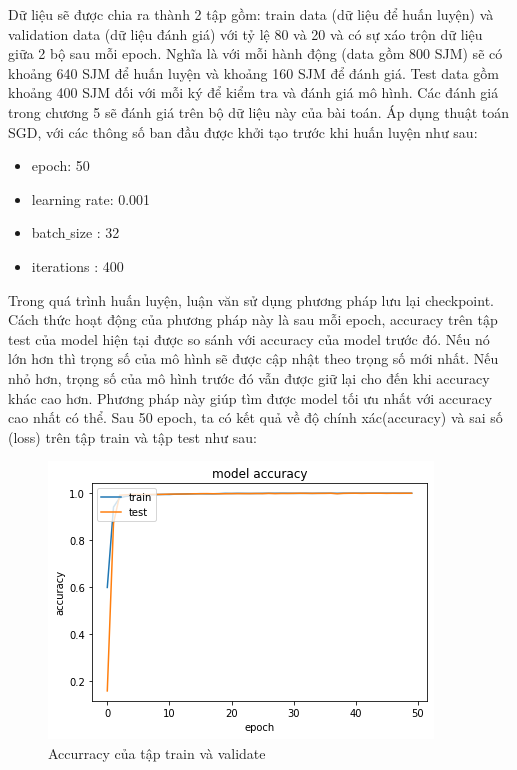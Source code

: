 Dữ liệu sẽ được chia ra thành 2 tập gồm: train data (dữ liệu để huấn luyện) và validation data (dữ liệu đánh giá) với tỷ lệ 80 và 20 và có sự xáo trộn dữ liệu giữa 2 bộ sau mỗi epoch. Nghĩa là với mỗi hành động (data gồm 800 SJM) sẽ có khoảng 640 SJM để huấn luyện và khoảng 160 SJM để đánh giá. Test data gồm khoảng 400 SJM đối với mỗi ký để kiểm tra và đánh giá mô hình. Các đánh giá trong chương 5 sẽ đánh giá trên bộ dữ liệu này của bài toán.
Áp dụng thuật toán SGD, với các thông số ban đầu được khởi tạo trước khi huấn luyện như sau:
\begin{itemize}
\item epoch: 50
\item learning rate: 0.001
\item batch$\_$size : 32
\item iterations : 400
\end{itemize}
Trong quá trình huấn luyện, luận văn sử dụng phương pháp lưu lại checkpoint. Cách thức hoạt động của phương pháp này là sau mỗi epoch, accuracy trên tập test của model hiện tại được so sánh với accuracy của model trước đó. Nếu nó lớn hơn thì trọng số của mô hình sẽ được cập nhật theo trọng số mới nhất. Nếu nhỏ hơn, trọng số của mô hình trước đó vẫn được giữ lại cho đến khi accuracy khác cao hơn. Phương pháp này giúp tìm được model tối ưu nhất với accuracy cao nhất có thể.
Sau 50 epoch, ta có kết quả về độ chính xác(accuracy) và sai số (loss) trên tập train và tập test như sau:
\FloatBarrier
\begin{figure}[htp]
\begin{center}
\includegraphics[scale=1]{chap4/c4_figs/train_val_acc.png}
\end{center}
\caption{Accurracy của tập train và validate}
\label{fig:pipelineS}
\end{figure}
\FloatBarrier

